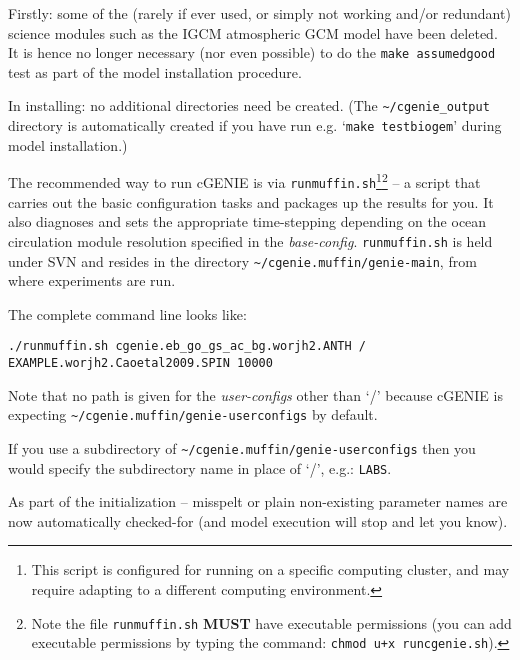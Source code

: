 \documentclass[10pt,twoside]{article}
\begin{document}
\begin{compactenum}

\item Firstly: some of the (rarely if ever used, or simply not working and/or redundant) science modules such as the IGCM atmospheric GCM model have been deleted. It is hence no longer necessary (nor even possible) to do the \texttt{make assumedgood} test as part of the model installation procedure.

\item In installing: no additional directories need be created.
(The \texttt{\~{}/cgenie\_output} directory is automatically created if you have run e.g. `\texttt{make testbiogem}' during model installation.)

\item The recommended way to run cGENIE is via \texttt{runmuffin.sh}\footnote{This script is configured for running on a specific computing cluster, and may require adapting to a different computing environment.}\footnote{Note the file \texttt{runmuffin.sh} \textbf{MUST} have executable permissions (you can add executable permissions by typing the command: \texttt{chmod u+x runcgenie.sh}).} -- a script that carries out the basic configuration tasks and packages up the results for you. It also diagnoses and sets the appropriate time-stepping depending on the ocean circulation module resolution specified in the \textit{base-config}. \texttt{runmuffin.sh} is held under SVN and resides in the directory \texttt{\~{}/cgenie.muffin/genie-main}, from where experiments are run.
 
\item The complete command line looks like:
\vspace{-5pt}\small\begin{verbatim}
./runmuffin.sh cgenie.eb_go_gs_ac_bg.worjh2.ANTH / EXAMPLE.worjh2.Caoetal2009.SPIN 10000
\end{verbatim}\normalsize\vspace{-5pt}
  
Note that no path is given for the \textit{user-configs} other than `/' because cGENIE is expecting \texttt{\~{}/cgenie.muffin/genie-userconfigs} by default.

If you use a subdirectory of \texttt{\~{}/cgenie.muffin/genie-userconfigs} then you would specify the subdirectory name in place of `/', e.g.: \texttt{LABS}.

\item As part of the initialization -- misspelt or plain non-existing parameter names are now automatically checked-for (and model execution will stop and let you know).


\end{compactenum}
\end{document}
